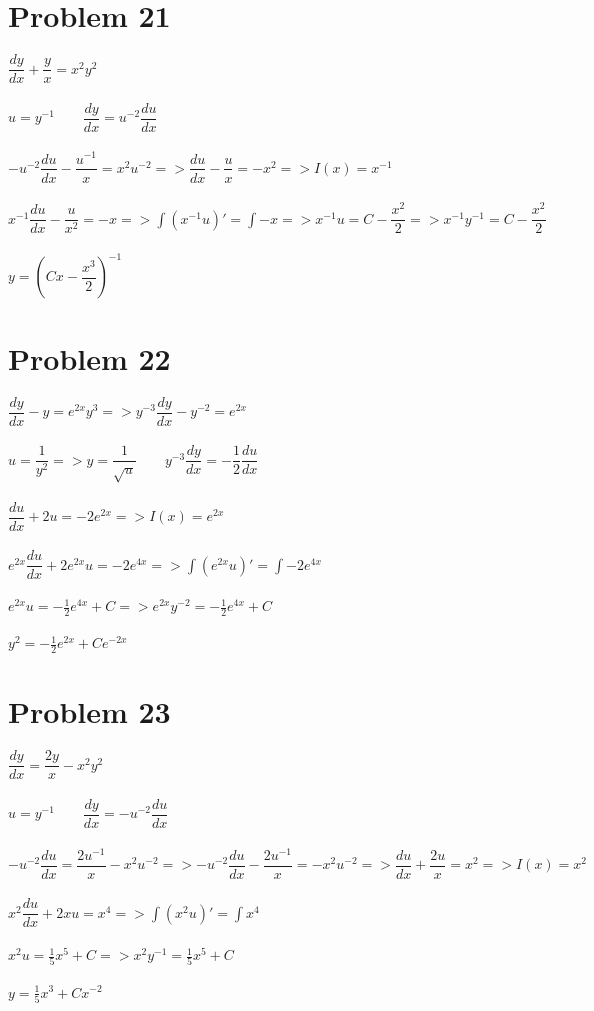 \documentclass[12pt]{exam}
\begin{document}
\section*{Problem 21}
$\dfrac{dy}{dx}+\dfrac{y}{x}=x^2y^2$\\\\
$u=y^{-1}\qquad \dfrac{dy}{dx}=u^{-2}\dfrac{du}{dx}$\\\\
$-u^{-2}\dfrac{du}{dx}-\dfrac{u^{-1}}{x}=x^2u^{-2}=>\dfrac{du}{dx}-\dfrac{u}{x}=-x^2=>I(x)=x^{-1}$\\\\
$x^{-1}\dfrac{du}{dx}-\dfrac{u}{x^2}=-x=>\int(x^{-1}u)'=\int-x=>x^{-1}u=C-\dfrac{x^2}{2}=>x^{-1}y^{-1}=C-\dfrac{x^2}{2}$\\\\
$y=\left(Cx-\dfrac{x^3}{2}\right)^{-1}$
\section*{Problem 22}
$\dfrac{dy}{dx}-y=e^{2x}y^3=>y^{-3}\dfrac{dy}{dx}-y^{-2}=e^{2x}$\\\\
$u=\dfrac{1}{y^2}=>y=\dfrac{1}{\sqrt{u}}\qquad y^{-3}\dfrac{dy}{dx}=-\dfrac{1}{2}\dfrac{du}{dx}$\\\\
$\dfrac{du}{dx}+2u=-2e^{2x}=>I(x)=e^{2x}$\\\\
$e^{2x}\dfrac{du}{dx}+2e^{2x}u=-2e^{4x}=>\int(e^{2x}u)'=\int-2e^{4x}$\\\\
$e^{2x}u=-\frac{1}{2}e^{4x}+C=>e^{2x}y^{-2}=-\frac{1}{2}e^{4x}+C$\\\\
$y^2=-\frac{1}{2}e^{2x}+Ce^{-2x}$
\section*{Problem 23}
$\dfrac{dy}{dx}=\dfrac{2y}{x}-x^2y^2$\\\\
$u=y^{-1}\qquad\dfrac{dy}{dx}=-u^{-2}\dfrac{du}{dx}$\\\\
$-u^{-2}\dfrac{du}{dx}=\dfrac{2u^{-1}}{x}-x^2u^{-2}=>-u^{-2}\dfrac{du}{dx}-\dfrac{2u^{-1}}{x}=-x^2u^{-2}=>\dfrac{du}{dx}+\dfrac{2u}{x}=x^2=>I(x)=x^2$\\\\
$x^2\dfrac{du}{dx}+2xu=x^4=>\int(x^2u)'=\int x^4$\\\\
$x^2u=\frac{1}{5}x^5+C=>x^2y^{-1}=\frac{1}{5}x^5+C$\\\\
$y=\frac{1}{5}x^3+Cx^{-2}$
\end{document}
